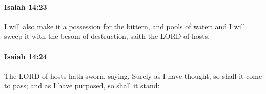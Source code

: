 		\paragraph{Isaiah 14:23} %
			\label{ISAIAH-14-23}

			I will also make it a possession for the bittern, and pools of water: and I will sweep it with the besom of destruction, saith the LORD of hosts.


		\paragraph{Isaiah 14:24} %
			\label{ISAIAH-14-24}

			The LORD of hosts hath sworn, saying, Surely as I have thought, so shall it come to pass; and as I have purposed, so shall it stand:


